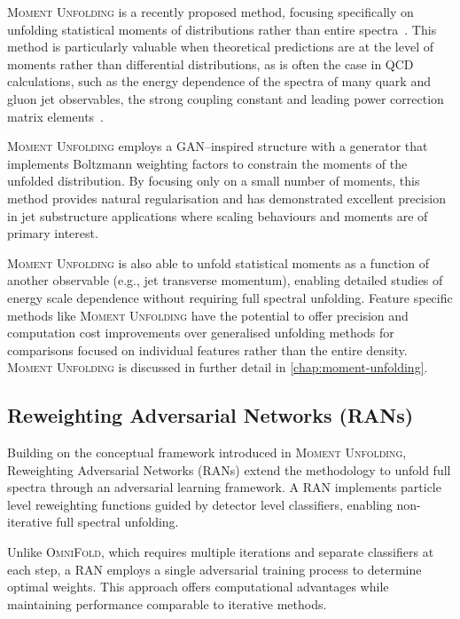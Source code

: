     \textsc{Moment Unfolding} is a recently proposed method, focusing specifically on unfolding statistical moments of distributions rather than entire spectra~\cite{desai2024moment}.
    This method is particularly valuable when theoretical predictions are at the level of moments rather than differential distributions, as is often the case in QCD calculations, such as the energy dependence of the spectra of many quark and gluon jet observables, the strong coupling constant and leading power correction matrix elements~\cite{Abbate:2012jh,pahlStudyMomentsEvent2009,OPAL:2004wof,L3:2004cdh,DELPHI:2004omy,DELPHI:2003yqh,Altarelli:1977zs,gribovDeepInelasticEp1972,dokshitzerCalculationStructureFunctions1977}.

    \textsc{Moment Unfolding} employs a GAN--inspired structure with a generator that implements Boltzmann weighting factors to constrain the moments of the unfolded distribution.
    By focusing only on a small number of moments, this method provides natural regularisation and has demonstrated excellent precision in jet substructure applications where scaling behaviours and moments are of primary interest.

    \textsc{Moment Unfolding} is also able to unfold statistical moments as a function of another observable (e.g., jet transverse momentum), enabling detailed studies of energy scale dependence without requiring full spectral unfolding.
    Feature specific methods like \textsc{Moment Unfolding} have the potential to offer precision and computation cost improvements over generalised unfolding methods for comparisons focused on individual features rather than the entire density.
    \textsc{Moment Unfolding} is discussed in further detail in \cref{chap:moment-unfolding}.

\subsection{Reweighting Adversarial Networks (RANs)}

    Building on the conceptual framework introduced in \textsc{Moment Unfolding}, Reweighting Adversarial Networks (RANs) extend the methodology to unfold full spectra through an adversarial learning framework.
    A RAN implements particle level reweighting functions guided by detector level classifiers, enabling non-iterative full spectral unfolding.

    Unlike \textsc{OmniFold}, which requires multiple iterations and separate classifiers at each step, a RAN employs a single adversarial training process to determine optimal weights.
    This approach offers computational advantages while maintaining performance comparable to iterative methods.

